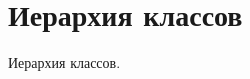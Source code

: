 \section{Иерархия классов}
Иерархия классов.\begin{DoxyCompactList}
\item {}
\begin{DoxyCompactList}
\item {}
\end{DoxyCompactList}
\end{DoxyCompactList}
